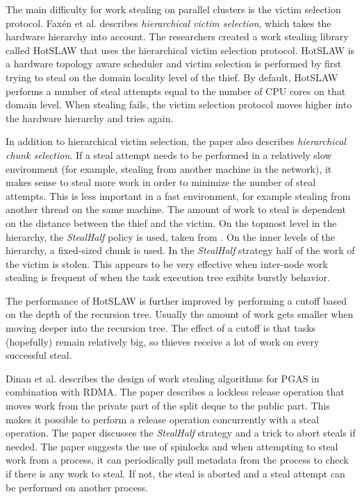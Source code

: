 The main difficulty for work stealing on parallel clusters is the victim selection protocol. Faxén et al. \cite{Faxen:2011:MWS:2016604.2016617} describes \emph{hierarchical victim selection}, which takes the hardware hierarchy into account. The researchers created a work stealing library called HotSLAW that uses the hierarchical victim selection protocol. HotSLAW is a hardware topology aware scheduler and victim selection is performed by first trying to steal on the domain locality level of the thief. By default, HotSLAW performs a number of steal attempts equal to the number of CPU cores on that domain level. When stealing fails, the victim selection protocol moves higher into the hardware hierarchy and tries again. 

In addition to hierarchical victim selection, the paper also describes \emph{hierarchical chunk selection}. If a steal attempt needs to be performed in a relatively slow environment (for example, stealing from another machine in the network), it makes sense to steal more work in order to minimize the number of steal attempts. This is less important in a fast environment, for example stealing from another thread on the same machine. The amount of work to steal is dependent on the distance between the thief and the victim. On the topmost level in the hierarchy, the \emph{StealHalf} policy is used, taken from \cite{dinan2009scalable}. On the inner levels of the hierarchy, a fixed-sized chunk is used. In the \emph{StealHalf} strategy half of the work of the victim is stolen. This appears to be very effective when inter-node work stealing is frequent of when the task execution tree exibits burstly behavior. 

The performance of HotSLAW is further improved by performing a cutoff based on the depth of the recursion tree. Usually the amount of work gets smaller when moving deeper into the recursion tree. The effect of a cutoff is that tasks (hopefully) remain relatively big, so thieves receive a lot of work on every successful steal.

Dinan et al. \cite{dinan2009scalable} describes the design of work stealing algorithms for PGAS in combination with RDMA. The paper describes a lockless release operation that moves work from the private part of the split deque to the public part. This makes it possible to perform a release operation concurrently with a steal operation. The paper discusses the \emph{StealHalf} strategy and a trick to abort steals if needed. The paper suggests the use of spinlocks and when attempting to steal work from a process, it can periodically pull metadata from the process to check if there is any work to steal. If not, the steal is aborted and a steal attempt can be performed on another process.

